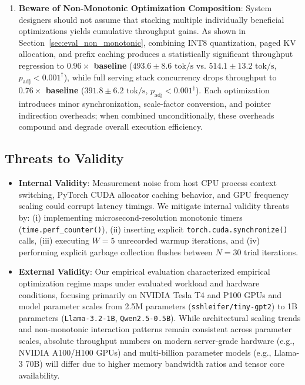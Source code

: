 \begin{enumerate}
    \item \textbf{Beware of Non-Monotonic Optimization Composition}: System designers should not assume that stacking multiple individually beneficial optimizations yields cumulative throughput gains. As shown in Section~\ref{sec:eval_non_monotonic}, combining INT8 quantization, paged KV allocation, and prefix caching produces a statistically significant throughput regression to \textbf{$0.96\times$ baseline} ($493.6 \pm 8.6\text{ tok/s}$ vs. $514.1 \pm 13.2\text{ tok/s}$, $p_{\text{adj}} < 0.001^\dagger$), while full serving stack concurrency drops throughput to \textbf{$0.76\times$ baseline} ($391.8 \pm 6.2\text{ tok/s}$, $p_{\text{adj}} < 0.001^\dagger$). Each optimization introduces minor synchronization, scale-factor conversion, and pointer indirection overheads; when combined unconditionally, these overheads compound and degrade overall execution efficiency.
\end{enumerate}

\subsection{Threats to Validity}
\label{sec:disc_threats}

\begin{itemize}
    \item \textbf{Internal Validity}: Measurement noise from host CPU process context switching, PyTorch CUDA allocator caching behavior, and GPU frequency scaling could corrupt latency timings. We mitigate internal validity threats by: (i) implementing microsecond-resolution monotonic timers (\texttt{time.perf\_counter()}), (ii) inserting explicit \texttt{torch.cuda.synchronize()} calls, (iii) executing $W=5$ unrecorded warmup iterations, and (iv) performing explicit garbage collection flushes between $N=30$ trial iterations.

    \item \textbf{External Validity}: Our empirical evaluation characterized empirical optimization regime maps under evaluated workload and hardware conditions, focusing primarily on NVIDIA Tesla T4 and P100 GPUs and model parameter scales from 2.5M parameters (\texttt{sshleifer/tiny-gpt2}) to 1B parameters (\texttt{Llama-3.2-1B}, \texttt{Qwen2.5-0.5B}). While architectural scaling trends and non-monotonic interaction patterns remain consistent across parameter scales, absolute throughput numbers on modern server-grade hardware (e.g., NVIDIA A100/H100 GPUs) and multi-billion parameter models (e.g., Llama-3 70B) will differ due to higher memory bandwidth ratios and tensor core availability.
\end{itemize}
